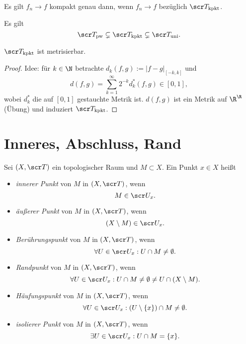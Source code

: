 \begin{st}
	Es gilt $f_n \to f$ kompakt genau dann, wenn $f_n \to f$ bezüglich $\scr T_{\text{kpkt}}$.
\end{st}

\begin{nt}
	Es gilt
	\[
		\scr T_{\text{pw}} \subsetneq \scr T_{\text{kpkt}} \subsetneq \scr T_{\text{uni}}.
	\]
\end{nt}

\begin{st}
	$\scr T_{\text{kpkt}}$ ist metrisierbar.
	\begin{proof}
		Idee: für $k \in \N$ betrachte $d_k(f,g) := |f-g|_{[-k,k]}$ und
		\[
			d(f,g) = \sum_{k=1}^\infty 2^{-k} d_k^* (f,g) \in [0,1],
		\]
		wobei $d_k^*$ die auf $[0,1]$ gestauchte Metrik ist.
		$d(f,g)$ ist ein Metrik auf $\R^\R$ (Übung) und induziert $\scr T_{\text{kpkt}}$.
	\end{proof}
\end{st}


\section{Inneres, Abschluss, Rand}


Sei $(X, \scr T)$ ein topologischer Raum und $M \subset X$.
Ein Punkt $x \in X$ heißt
\begin{itemize}
	\item
		\emph{innerer Punkt} von $M$ in $(X,\scr T)$, wenn
		\[
			M \in \scr U_x.
		\]
	\item
		\emph{äußerer Punkt} von $M$ in $(X,\scr T)$, wenn
		\[
			(X \setminus M) \in \scr U_x.
		\]
	\item
		\emph{Berührungspunkt} von $M$ in $(X, \scr T)$, wenn
		\[
			\forall U \in \scr U_x : U \cap M \neq \emptyset.
		\]
	\item
		\emph{Randpunkt} von $M$ in $(X, \scr T)$, wenn
		\[
			\forall U \in \scr U_x : U \cap M \neq \emptyset \neq U \cap (X \setminus M).
		\]
	\item
		\emph{Häufungspunkt} von $M$ in $(X, \scr T)$, wenn
		\[
			\forall U \in \scr U_x : (U \setminus \{x\}) \cap M \neq \emptyset.
		\]
	\item
		\emph{isolierer Punkt} von $M$ in $(X, \scr T)$, wenn
		\[
			\exists U \in \scr U_x : U \cap M = \{x\}.
		\]
\end{itemize}

